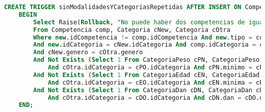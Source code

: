 \begin{lstlisting}[language=SQL]
CREATE TRIGGER sinModalidadesYCategoriasRepetidas AFTER INSERT ON Competencia
    BEGIN
        Select Raise(Rollback, "No puede haber dos competencias de igual modalidad y con categorías iguales .")
        From Competencia comp, Categoria cNew, Categoria cOtra
        Where new.idCompetencia != comp.idCompetencia And new.tipo = comp.tipo 
        And new.idCategoria = cNew.idCategoria And comp.idCategoria = cOtra.idCategoria 
        And cNew.genero = cOtra.genero
        And Not Exists (Select 1 From CategoriaPeso cPN, CategoriaPeso cPO Where cNew.idCategoria = cPN.idCategoria 
            And cOtra.idCategoria = cPO.idCategoria And cPN.minimo = cPO.minimo And cPN.maximo = cPO.maximo)
        And Not Exists (Select 1 From CategoriaEdad cEN, CategoriaEdad cEO Where cNew.idCategoria = cEN.idCategoria 
            And cOtra.idCategoria = cEO.idCategoria And cEN.minima = cEO.minima And cEN.maxima = cEO.maxima)
        And Not Exists (Select 1 From CategoriaDan cDN, CategoriaDan cDO Where cNew.idCategoria = cDN.idCategoria 
            And cOtra.idCategoria = cDO.idCategoria And cDN.dan = cDO.dan);
    END;
\end{lstlisting}
